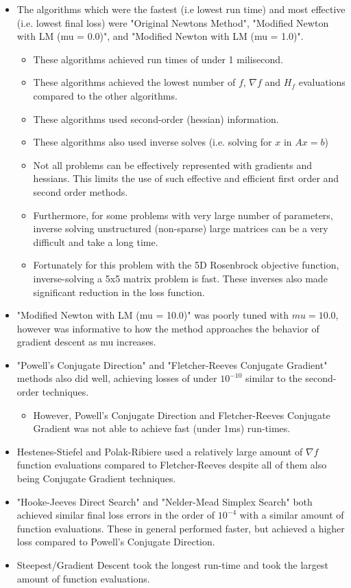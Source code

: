 \documentclass{article}
\begin{document}
    \begin{itemize}
        \item The algorithms which were the fastest (i.e lowest run time) and most effective (i.e. lowest final loss) were "Original Newtons Method", "Modified Newton with LM (mu = 0.0)", and "Modified Newton with LM (mu = 1.0)".
        \begin{itemize}
            \item These algorithms achieved run times of under 1 milisecond.
            \item These algorithms achieved the lowest number of $f$, $\nabla f$ and $H_f$ evaluations compared to the other algorithms.
            \item These algorithms used second-order (hessian) information.
            \item These algorithms also used inverse solves (i.e. solving for $x$ in $Ax = b$)
            \item Not all problems can be effectively represented with gradients and hessians. This limits the use of such effective and efficient first order and second order methods.
            \item Furthermore, for some problems with very large number of parameters, inverse solving unstructured (non-sparse) large matrices can be a very difficult and take a long time.
            \item Fortunately for this problem with the 5D Rosenbrock objective function, inverse-solving a 5x5 matrix problem is fast. These inverses also made significant reduction in the loss function.
        \end{itemize}
        \item "Modified Newton with LM (mu = 10.0)" was poorly tuned with $mu = 10.0$, however was informative to how the method approaches the behavior of gradient descent as mu increases.
        \item "Powell's Conjugate Direction" and "Fletcher-Reeves Conjugate Gradient" methods also did well, achieving losses of under $10^{-10}$ similar to the second-order techniques.
        \begin{itemize}
            \item However, Powell's Conjugate Direction and Fletcher-Reeves Conjugate Gradient was not able to achieve fast (under 1ms) run-times.
        \end{itemize} 
        \item Hestenes-Stiefel and Polak-Ribiere used a relatively large amount of $\nabla f$ function evaluations compared to Fletcher-Reeves despite all of them also being Conjugate Gradient techniques.
        \item "Hooke-Jeeves Direct Search" and "Nelder-Mead Simplex Search" both achieved similar final loss errors in the order of $10^{-4}$ with a similar amount of function evaluations. These in general performed faster, but achieved a higher loss compared to Powell's Conjugate Direction.
        \item Steepest/Gradient Descent took the longest run-time and took the largest amount of function evaluations.
    \end{itemize}
\end{document}
